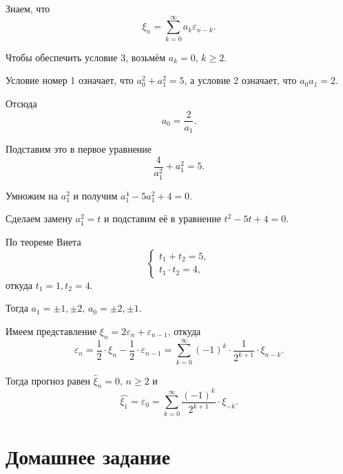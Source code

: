 Знаем, что
\begin{equation*}
  \xi_n =
  \sum \limits_{k = 0}^{ \infty } a_k \varepsilon_{n - k}.
\end{equation*}

Чтобы обеспечить условие 3, возьмём $a_k = 0, \, k \geq 2$.

Условие номер 1 означает, что $a_0^2 + a_1^2 = 5$, а условие 2 означает, что $a_0 a_1 = 2$.

Отсюда
\begin{equation*}
  a_0 =
  \frac{2}{a_1}.
\end{equation*}

Подставим это в первое уравнение
\begin{equation*}
  \frac{4}{a_1^2} + a_1^2 = 5.
\end{equation*}

Умножим на $a_1^2$ и получим $a_1^4 - 5a_1^2 + 4 = 0$.

Сделаем замену $a_1^2 = t$ и подставим её в уравнение $t^2 - 5t + 4 = 0$.

По теореме Виета
\begin{equation*}
  \begin{cases}
    t_1 + t_2 = 5, \\
    t_1 \cdot t_2 = 4,
  \end{cases}
\end{equation*}
откуда $t_1 = 1, t_2 = 4$.

Тогда $a_1 = \pm 1, \pm 2, \, a_0 = \pm 2, \pm 1$.

Имеем представление $ \xi_n = 2 \varepsilon_n + \varepsilon_{n - 1}$, откуда
\begin{equation*}
  \varepsilon_n =
  \frac{1}{2} \cdot \xi_n - \frac{1}{2} \cdot \varepsilon_{n - 1} =
  \sum \limits_{k = 0}^{ \infty } \left( -1 \right)^k \cdot \frac{1}{2^{k + 1}} \cdot \xi_{n - k}.
\end{equation*}

Тогда прогноз равен $ \hat{ \xi }_n = 0, \, n \geq 2$ и
\begin{equation*}
  \hat{ \xi_1} =
  \varepsilon_0 =
  \sum \limits_{k = 0}^{ \infty } \frac{ \left( -1 \right)^k}{2^{k + 1}} \cdot \xi_{-k}.
\end{equation*}

\section*{Домашнее задание}
